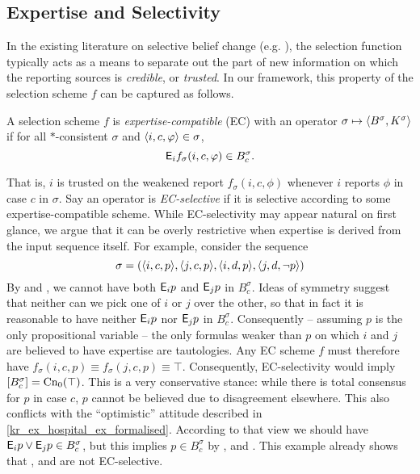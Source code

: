 \subsection{Expertise and Selectivity}

In the existing literature on selective belief change (e.g.
\cite{ferme1999selective,booth_trust_2018}), the selection function typically
acts as a means to separate out the part of new information on which the
reporting sources is \emph{credible}, or \emph{trusted}. In our framework, this
property of the selection scheme $f$ can be captured as follows.

\begin{definition}
    \label{kr_def_ec_scheme}
    A selection scheme $f$ is \emph{expertise-compatible} (EC) with an operator
    $\sigma \mapsto \langle {B^\sigma, K^\sigma} \rangle$ if for all $\ast$-consistent
    $\sigma$ and $\langle {i, c, \varphi} \rangle \in \sigma$,
    \[
        \mathsf{E}_i{f_\sigma(i, c, \varphi)} \in B^\sigma_c.
    \]
\end{definition}

That is, $i$ is trusted on the weakened report $f_\sigma(i, c, \phi)$ whenever
$i$ reports $\phi$ in case $c$ in $\sigma$.
%
Say an operator is \emph{EC-selective} if it is selective according to some
expertise-compatible scheme. While EC-selectivity may appear natural on first
glance, we argue that it can be overly restrictive when expertise is derived
from the input sequence itself. For example, consider the sequence
\[
    \sigma = (
        \langle {i, c, p} \rangle,
        \langle {j, c, p} \rangle,
        \langle {i, d, p} \rangle,
        \langle {j, d, \neg p} \rangle
    )
\]
By \soundness{} and \closure{}, we cannot have both $\mathsf{E}_i{p}$ and $\mathsf{E}_j{p}$ in
$B^\sigma_c$. Ideas of symmetry suggest that neither can we pick one of $i$ or
$j$ over the other, so that in fact it is reasonable to have neither $\mathsf{E}_i{p}$
nor $\mathsf{E}_j{p}$ in $B^\sigma_c$. Consequently -- assuming $p$ is the only
propositional variable -- the only formulas weaker than $p$ on which $i$ and
$j$ are believed to have expertise are tautologies. Any EC scheme $f$ must
therefore have $f_\sigma(i, c, p) \equiv f_\sigma(j, c, p) \equiv \top$.
Consequently, EC-selectivity would imply $\left[{B^\sigma_c}\right] =
\operatorname{Cn}_0(\top)$. This is a very conservative stance: while there is total
consensus for $p$ in case $c$, $p$ cannot be believed due to disagreement
elsewhere. This also conflicts with the ``optimistic'' attitude described in
\cref{kr_ex_hospital_ex_formalised}. According to that view we should have
$\mathsf{E}_i{p}
\lor \mathsf{E}_j{p} \in B^\sigma_c$, but this implies $p \in B^\sigma_c$ by
\soundness{}, \containment{} and \closure{}.
%
This example already shows that \varbasedcond{}, \partbasedcond{} and
\scorebasedop{} are not EC-selective.

